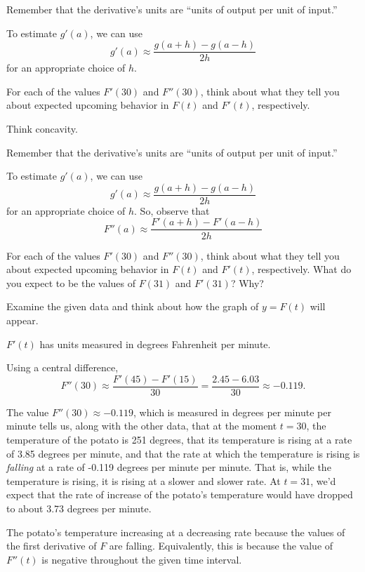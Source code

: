 \begin{smallhint}
\ba
	\item Remember that the derivative's units are ``units of output per unit of input.'' 
	\item To estimate $g'(a)$, we can use 
	$$g'(a) \approx \frac{g(a+h)-g(a-h)}{2h}$$
	for an appropriate choice of $h$.
	\item For each of the values $F'(30)$ and $F''(30)$, think about what they tell you about expected upcoming behavior in $F(t)$ and $F'(t)$, respectively.
	\item Think concavity.
\ea
\end{smallhint}
\begin{bighint}
\ba
	\item Remember that the derivative's units are ``units of output per unit of input.'' 
	\item To estimate $g'(a)$, we can use 
	$$g'(a) \approx \frac{g(a+h)-g(a-h)}{2h}$$
	for an appropriate choice of $h$.  So, observe that
	$$F''(a) \approx \frac{F'(a+h)-F'(a-h)}{2h}$$
	\item For each of the values $F'(30)$ and $F''(30)$, think about what they tell you about expected upcoming behavior in $F(t)$ and $F'(t)$, respectively.  What do you expect to be the values of $F(31)$ and $F'(31)$?  Why?
	\item Examine the given data and think about how the graph of $y = F(t)$ will appear.
\ea
\end{bighint}
\begin{activitySolution}
\ba
	\item $F'(t)$ has units measured in degrees Fahrenheit per minute. 
	\item Using a central difference, 
	$$F''(30) \approx \frac{F'(45)-F'(15)}{30} = \frac{2.45-6.03}{30} \approx -0.119.$$
	\item The value $F''(30) \approx -0.119$, which is measured in degrees per minute per minute tells us, along with the other data, that at the moment $t = 30$, the temperature of the potato is 251 degrees, that its temperature is rising at a rate of 3.85 degrees per minute, and that the rate at which the temperature is rising is \emph{falling} at a rate of -0.119 degrees per minute per minute.  That is, while the temperature is rising, it is rising at a slower and slower rate.  At $t = 31$, we'd expect that the rate of increase of the potato's temperature would have dropped to about 3.73 degrees per minute.
	\item The potato's temperature increasing at a decreasing rate because the values of the first derivative of $F$ are falling.  Equivalently, this is because the value of $F''(t)$ is negative throughout the given time interval.
\ea
\end{activitySolution}
\aftera